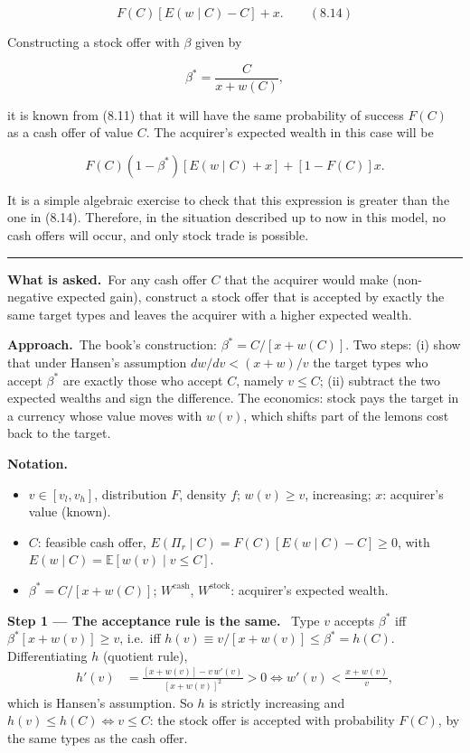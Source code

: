 \documentclass[11pt,a4paper]{article}
\newcommand{\notation}{\par\noindent\textbf{Notation.}}
\newcommand{\step}[2]{\par\medskip\noindent\textbf{Step #1 --- #2.}~}
\newcommand{\asked}{\par\medskip\noindent\textbf{What is asked.}~}
\newcommand{\approach}{\par\smallskip\noindent\textbf{Approach.}~}
\newcommand{\E}{\mathbb{E}}
\newcommand{\stmtend}{\par\endgroup\nopagebreak\noindent\rule{\linewidth}{0.4pt}\par\medskip}
\begin{document}
\[F(C)[E(w \mid C) - C] + x. \qquad (8.14)\]

Constructing a stock offer with \(\beta\) given by

\[\beta^* = \frac{C}{x + w(C)},\]

it is known from (8.11) that it will have the same probability of success \(F(C)\) as a cash offer
of value \(C\). The acquirer's expected wealth in this case will be

\[F(C)(1 - \beta^*)[E(w \mid C) + x] + [1 - F(C)]x.\]

It is a simple algebraic exercise to check that this expression is greater than the one in (8.14).
Therefore, in the situation described up to now in this model, no cash offers will occur, and only
stock trade is possible.
\stmtend

\asked For any cash offer $C$ that the acquirer would make (non-negative expected gain), construct a
stock offer that is accepted by exactly the same target types and leaves the acquirer with a higher
expected wealth.

\approach The book's construction: $\beta^*=C/[x+w(C)]$. Two steps: (i) show that under Hansen's
assumption $dw/dv<(x+w)/v$ the target types who accept $\beta^*$ are exactly those who accept $C$,
namely $v\le C$; (ii) subtract the two expected wealths and sign the difference. The economics: stock
pays the target in a currency whose value moves with $w(v)$, which shifts part of the lemons cost back to
the target.

\notation
\begin{itemize}
  \item $v\in[v_l,v_h]$, distribution $F$, density $f$; $w(v)\ge v$, increasing; $x$: acquirer's value (known).
  \item $C$: feasible cash offer, $E(\Pi_r\mid C)=F(C)[E(w\mid C)-C]\ge 0$, with $E(w\mid C)=\E[w(v)\mid v\le C]$.
  \item $\beta^*=C/[x+w(C)]$; $W^{\text{cash}}$, $W^{\text{stock}}$: acquirer's expected wealth.
\end{itemize}

\step{1}{The acceptance rule is the same} Type $v$ accepts $\beta^*$ iff $\beta^*[x+w(v)]\ge v$, i.e.\ iff
$h(v)\equiv v/[x+w(v)]\le\beta^*=h(C)$. Differentiating $h$ (quotient rule),
\begin{align}
  h'(v) &= \frac{[x+w(v)]-v\,w'(v)}{[x+w(v)]^2} > 0 \iff w'(v) < \frac{x+w(v)}{v}, \label{r9e12-h}
\end{align}
which is Hansen's assumption. So $h$ is strictly increasing and $h(v)\le h(C)\iff v\le C$: the stock offer
is accepted with probability $F(C)$, by the same types as the cash offer.
\end{document}
